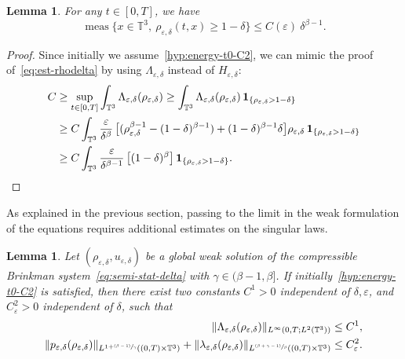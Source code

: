 \documentclass[10pt]{amsart}
\newcommand{\<}{\bigl\langle}
\renewcommand{\>}{\bigr\rangle}
\newcommand{\psfrac}[2]{\sfrac{(#1)}{#2}}
\DeclareMathOperator{\meas}{meas}
\newtheorem{lem}[thm]{Lemma}
\theoremstyle{definition}
\theoremstyle{remark}
\newcommand{\TT}{\mathbb{T}^3}
\let\ep\varepsilon
\begin{document}
\begin{lem}\label{lem:bound-rhod-Lambda}
For any $t \in [0,T]$, we have
\begin{equation}\label{eq:est-rho-delta-2}
\meas \big\{ x\in \TT, \ \rho_{\ep,\delta}(t,x) \geq 1-\delta \big\} \leq C(\ep) \ \delta^{\beta-1}.
\end{equation}
\end{lem}

\begin{proof} 
Since initially we assume~\eqref{hyp:energy-t0-C2}, we can mimic the proof of~\eqref{eq:est-rhodelta} by using $\Lambda_{\ep,\delta}$ instead of $H_{\ep,\delta}$:
\begin{align*}
C &\geq \sup_{t\in [0,T]} \int_{\TT}{\Lambda_{\ep,\delta}(\rho_{\ep,\delta})}
 \geq \int_{\TT}{\Lambda_{\ep,\delta}(\rho_{\ep,\delta}) \,\mathbf{1}_{\{ \rho_{\ep,\delta} > 1-\delta \}}} \\
& \geq C\int_{\TT}{\dfrac{\ep}{\delta^\beta}\,\bigl[
(\rho_{\varepsilon,\delta}^{\beta-1} - (1-\delta)^{\beta-1})
+ (1-\delta)^{\beta-1}\delta \bigr] \rho_{\ep,\delta}
\,\mathbf{1}_{\{ \rho_{\ep,\delta} > 1-\delta \}}} \\
& \geq C\int_{\TT}{\dfrac{\ep}{\delta^{\beta-1} }\,\bigl[
(1-\delta)^{\beta} \bigr]
\,\mathbf{1}_{\{ \rho_{\ep,\delta} > 1-\delta \}}}.\qedhere
\end{align*}
\end{proof}

As explained in the previous section, passing to the limit in the weak formulation of the equations requires additional estimates on the singular laws.

\begin{lem}\label{lem:controls-2}Let $(\rho_{\varepsilon, \delta}, u_{\varepsilon,\delta})$ be a global weak solution of the compressible Brinkman system~\eqref{eq:semi-stat-delta} with $\gamma \in (\beta-1,\beta]$.
If initially~\eqref{hyp:energy-t0-C2} is satisfied, then there exist two constants $C^1>0$ independent of $\delta,\ep$, and $C^2_\ep> 0$ independent of $\delta$, such that
\begin{align*}
\|\Lambda_{\ep,\delta}(\rho_{\ep,\delta})\|_{L^\infty(0,T; L^2(\TT))}
&\leq C^1,\\
\|p_{\ep,\delta}(\rho_{\ep,\delta})\|_{L^{1+\psfrac{\beta-1}{\gamma}}((0,T)\times \TT)} + \|\lambda_{\ep,\delta}(\rho_{\ep,\delta})\|_{L^{\psfrac{\beta + \gamma -1}{\beta}}((0,T)\times \TT)}
&\leq C^2_\ep.
\end{align*}
\end{lem}
\end{document}
